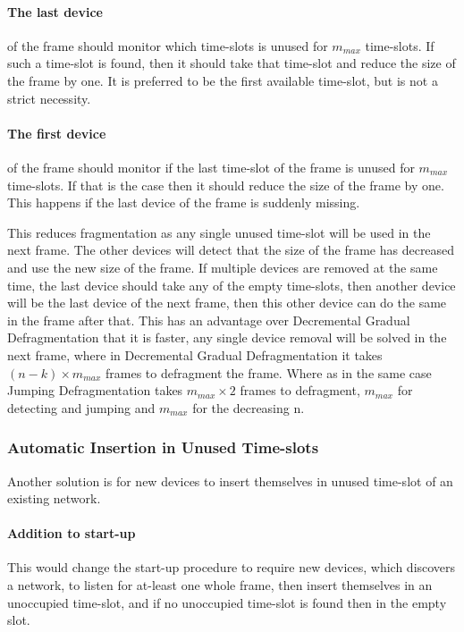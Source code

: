 \paragraph{The last device} of the frame should monitor which time-slots is unused for $m_{max}$ time-slots. 
If such a time-slot is found, then it should take that time-slot and reduce the size of the frame by one. 
It is preferred to be the first available time-slot, but is not a strict necessity.   

\paragraph{The first device} of the frame should monitor if the last time-slot of the frame is unused for $m_{max}$ time-slots.
If that is the case then it should reduce the size of the frame by one.
This happens if the last device of the frame is suddenly missing.


\bigskip

This reduces fragmentation as any single unused time-slot will be used in the next frame.
The other devices will detect that the size of the frame has decreased and use the new size of the frame. 
If multiple devices are removed at the same time, the last device should take any of the empty time-slots, then another device will be the last device of the next frame, then this other device can do the same in the frame after that. 
This has an advantage over Decremental Gradual Defragmentation that it is faster, any single device removal will be solved in the next frame, where in Decremental Gradual Defragmentation it takes $(n - k) \times m_{max}$ frames to defragment the frame. 
Where as in the same case Jumping Defragmentation takes $m_{max} \times 2$ frames to defragment, $m_{max}$ for detecting and jumping and $m_{max}$ for the decreasing n. 

\subsubsection{Automatic Insertion in Unused Time-slots}
Another solution is for new devices to insert themselves in unused time-slot of an existing network.

\paragraph{Addition to start-up}
This would change the start-up procedure to require new devices, which discovers a network, to listen for at-least one whole frame, then insert themselves in an unoccupied time-slot, and if no unoccupied time-slot is found then in the empty slot. 

